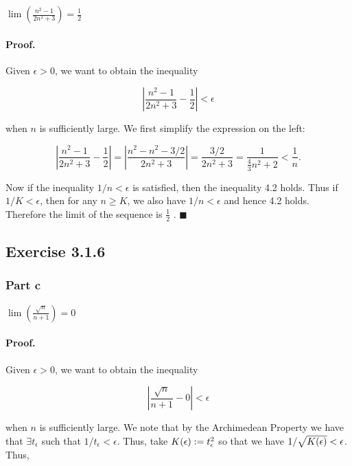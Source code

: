 \documentclass[paper=a4, fontsize=11pt]{scrartcl} %
\numberwithin{equation}{section} %
\numberwithin{figure}{section} %
\numberwithin{table}{section} %
\begin{document}
$\lim\left(\frac{n^2 - 1}{2n^2 + 3}\right) = \frac{1}{2}$

\paragraph{Proof.} Given $\epsilon > 0$, we want to obtain the inequality

\begin{equation}
\left| \frac{n^2 - 1}{2n^2 + 3} - \frac{1}{2}\right| < \epsilon
\end{equation}

when $n$ is sufficiently large. We first simplify the expression on the left:

\begin{equation*}
\left| \frac{n^2 - 1}{2n^2 + 3} - \frac{1}{2}\right| = \left|\frac{n^2 - n^2 - 3/2}{2n^2 + 3}\right| = \frac{3/2}{2n^2 + 3} = \frac{1}{\frac{4}{3}n^2 + 2} < \frac{1}{n}.
\end{equation*}

Now if the inequality $1/n < \epsilon$ is satisfied, then the inequality 4.2 holds. Thus if $1/K < \epsilon$, then for any $n \geq K$, we also have $1/n < \epsilon$ and hence 4.2 holds. Therefore the limit of the sequence is $\frac{1}{2}$ . $\blacksquare$\\

\subsection*{Exercise 3.1.6}
\subsubsection*{Part c}

$\lim\left(\frac{\sqrt{n}}{n+1}\right) = 0$

\paragraph{Proof.} Given $\epsilon > 0$, we want to obtain the inequality

\begin{equation}
\left|\frac{\sqrt{n}}{n+1} - 0\right| < \epsilon
\end{equation}

when $n$ is sufficiently large. We note that by the Archimedean Property we have that $\exists t_\epsilon$ such that $1/t_\epsilon < \epsilon$. Thus, take $K(\epsilon) := t_{\epsilon}^2$ so that we have $1/\sqrt{K(\epsilon)} < \epsilon$. Thus,
\end{document}
